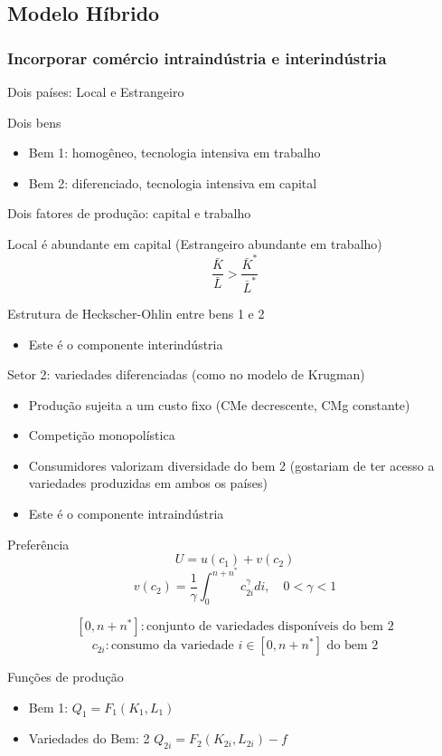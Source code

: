 \documentclass[a4paper,12pt]{article}[abntex2]
\begin{document}
\subsection{\textbf{Modelo Híbrido}}
\subsubsection{\textbf{Incorporar comércio intraindústria e interindústria}}
Dois países: Local e Estrangeiro

Dois bens
\begin{itemize}
  \item Bem 1: homogêneo, tecnologia intensiva em trabalho
  \item Bem 2: diferenciado, tecnologia intensiva em capital
\end{itemize}

Dois fatores de produção: capital e trabalho

Local é abundante em capital (Estrangeiro abundante em trabalho)
\[
\frac{\bar{K}}{\bar{L}} > \frac{\bar{K}^*}{\bar{L}^*}
\]

Estrutura de Heckscher-Ohlin entre bens 1 e 2
\begin{itemize}
  \item Este é o componente interindústria
\end{itemize}

Setor 2: variedades diferenciadas (como no modelo de Krugman)
\begin{itemize}
  \item Produção sujeita a um custo fixo (CMe decrescente, CMg constante)
  \item Competição monopolística
  \item Consumidores valorizam diversidade do bem 2 (gostariam de ter acesso a variedades produzidas em ambos os países)
  \item Este é o componente intraindústria
\end{itemize}

Preferência
\[
U = u(c_1) + v(c_2)
\]
\[
v(c_2) = \frac{1}{\gamma} \int_0^{n+n^*} c_{2i}^\gamma di, \quad 0 < \gamma < 1
\]

\[
[0, n + n^*] : \text{conjunto de variedades disponíveis do bem 2}
\]
\[
c_{2i} : \text{consumo da variedade } i \in [0, n + n^*] \text{ do bem 2}
\]

Funções de produção
\begin{itemize}
  \item Bem 1: $Q_1 = F_1(K_1, L_1)$
  \item Variedades do Bem: 2 $Q_{2i} = F_2(K_{2i}, L_{2i}) - f$
\end{itemize}
\end{document}
